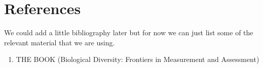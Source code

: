 \documentclass[a4paper]{article}
\begin{document}
\section{References}

We could add a little bibliography later but for now we can just list some of
the relevant material that we are using.

\begin{enumerate}

    \item THE BOOK (Biological Diversity: Frontiers in Measurement and
        Assessment)

\end{enumerate}
\end{document}
